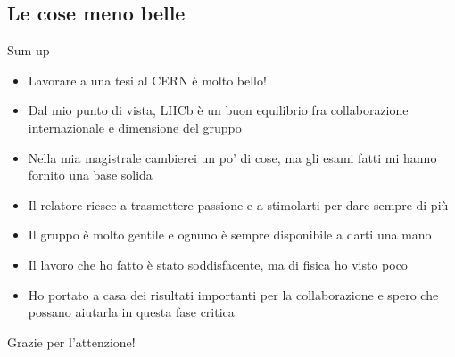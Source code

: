 \documentclass[
10pt,
aspectratio=169,
]{beamer}
\begin{document}
\subsection{Le cose meno belle}


\begin{frame}{Sum up}
\begin{itemize}
    \item Lavorare a una tesi al CERN è molto bello!
    \item Dal mio punto di vista, LHCb è un buon equilibrio fra collaborazione internazionale e dimensione del gruppo
    \item Nella mia magistrale cambierei un po' di cose, ma gli esami fatti mi hanno fornito una base solida
    \item Il relatore riesce a trasmettere passione e a stimolarti per dare sempre di più
    \item Il gruppo è molto gentile e ognuno è sempre disponibile a darti una mano
    \item Il lavoro che ho fatto è stato soddisfacente, ma di fisica ho visto poco
    \item Ho portato a casa dei risultati importanti per la collaborazione e spero che possano aiutarla in questa fase critica
\end{itemize}
    
\end{frame}

\begin{frame}
	\vfill
	\centering
	{
		\centering \Huge \color{white} Grazie per l'attenzione!%
	}
	\vfill
\end{frame}

\end{document}
